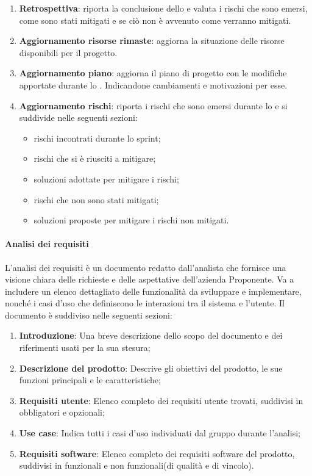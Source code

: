 \begin{itemize}
\begin{enumerate}
        \item \textbf{Retrospettiva}: riporta la conclusione dello  e valuta i rischi che sono emersi, come sono stati mitigati e se ciò non è avvenuto come verranno mitigati.
        
        \item \textbf{Aggiornamento risorse rimaste}: aggiorna la situazione delle risorse disponibili per il progetto.
        
        \item \textbf{Aggiornamento piano}: aggiorna il piano di progetto con le modifiche apportate durante lo . Indicandone cambiamenti e motivazioni per esse.
        
        \item \textbf{Aggiornamento rischi}: riporta i rischi che sono emersi durante lo  e si suddivide nelle seguenti sezioni: 
            \begin{itemize}
                \item rischi incontrati durante lo sprint;
                \item rischi che si è riusciti a mitigare;
                \item soluzioni adottate per mitigare i rischi;
                \item rischi che non sono stati mitigati;
                \item soluzioni proposte per mitigare i rischi non mitigati.
            \end{itemize}
    \end{enumerate}
\end{itemize}

\paragraph{Analisi dei requisiti}
L’analisi dei requisiti è un documento redatto dall’analista che fornisce una visione chiara delle richieste e delle aspettative dell’azienda Proponente. Va a includere un elenco dettagliato delle funzionalità da sviluppare e implementare, nonché i casi d’uso che definiscono le interazioni tra il sistema e l’utente.
Il documento è suddiviso nelle seguenti sezioni:
\begin{enumerate}
    \item \textbf{Introduzione}: Una breve descrizione dello scopo del documento e dei riferimenti usati per la sua stesura;
    \item \textbf{Descrizione del prodotto}: Descrive gli obiettivi del prodotto, le sue funzioni principali e le caratteristiche;
    \item \textbf{Requisiti utente}: Elenco completo dei requisiti utente trovati, suddivisi in obbligatori e opzionali;
    \item \textbf{Use case}: Indica tutti i casi d’uso individuati dal gruppo durante l'analisi;
    \item \textbf{Requisiti software}: Elenco completo dei requisiti software del prodotto, suddivisi in funzionali e non funzionali(di qualità e di vincolo).
\end{enumerate}

